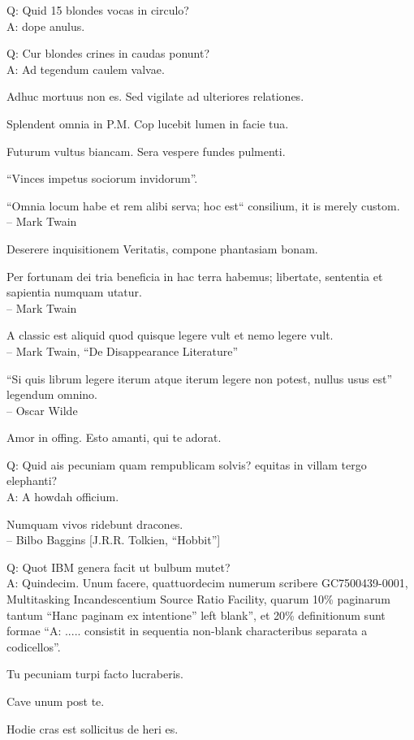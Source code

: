 \documentclass[titlepage,12pt]{memoir}
\begin{document}
Q: Quid 15 blondes vocas in circulo?\\
A: dope anulus.

Q: Cur blondes crines in caudas ponunt?\\
A: Ad tegendum caulem valvae.

Adhuc mortuus non es. Sed vigilate ad ulteriores relationes.

Splendent omnia in P.M. Cop lucebit lumen in facie tua.

Futurum vultus biancam. Sera vespere fundes pulmenti.

“Vinces impetus sociorum invidorum”.

“Omnia locum habe et rem alibi serva; hoc est“
consilium, it is merely custom.
\\-- Mark Twain

Deserere inquisitionem Veritatis, compone phantasiam bonam.

Per fortunam dei tria beneficia in hac terra habemus;
libertate, sententia et sapientia numquam utatur.
\\-- Mark Twain

A classic est aliquid quod quisque legere vult
et nemo legere vult.
\\-- Mark Twain, “De Disappearance Literature”

“Si quis librum legere iterum atque iterum legere non potest, nullus usus est”
legendum omnino.
\\-- Oscar Wilde

Amor in offing. Esto amanti, qui te adorat.

Q: Quid ais pecuniam quam rempublicam solvis?
equitas in villam tergo elephanti?\\
A: A howdah officium.

Numquam vivos ridebunt dracones.
\\-- Bilbo Baggins [J.R.R. Tolkien, “Hobbit”]

Q: Quot IBM genera facit ut bulbum mutet?\\
A: Quindecim. Unum facere, quattuordecim numerum scribere
GC7500439-0001, Multitasking Incandescentium Source Ratio Facility,
quarum 10\% paginarum tantum “Hanc paginam ex intentione”
left blank”, et 20\% definitionum sunt formae “A: .....
consistit in sequentia non-blank characteribus separata a codicellos”.

Tu pecuniam turpi facto lucraberis.

Cave unum post te.

Hodie cras est sollicitus de heri es.
\end{document}
